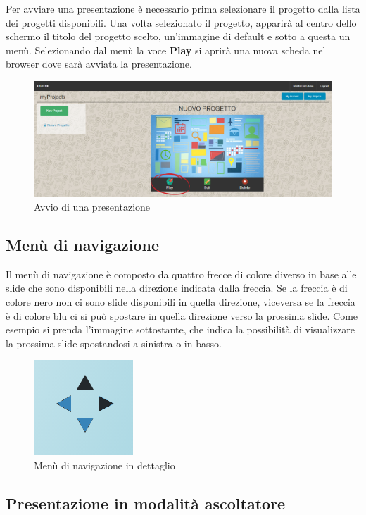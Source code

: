 Per avviare una presentazione è necessario prima selezionare il progetto dalla lista dei progetti disponibili. Una volta selezionato il progetto, apparirà al centro dello schermo il titolo del progetto scelto, un'immagine di default e sotto a questa un menù. Selezionando dal menù la voce \textbf{Play} si aprirà una nuova scheda nel browser dove sarà avviata la presentazione.

\begin{figure}[H] 
	\centering 
	\includegraphics[scale=0.40] {img/avv_pres.png}
	\caption{Avvio di una presentazione} 
\end{figure}

\subsection{Menù di navigazione}
\noindent Il menù di navigazione è composto da quattro frecce di colore diverso in base alle slide che sono disponibili nella direzione indicata dalla freccia. Se la freccia è di colore nero non ci sono slide disponibili in quella direzione, viceversa se la freccia è di colore blu ci si può spostare in quella direzione verso la prossima slide. Come esempio si prenda l'immagine sottostante, che indica la possibilità di visualizzare la prossima slide spostandosi a sinistra o in basso.

\begin{figure}[H] 
	\centering 
	\includegraphics[scale=0.70] {img/nav.png}
	\caption{Menù di navigazione in dettaglio} 
	\end{figure}

\subsection{Presentazione in modalità ascoltatore}

